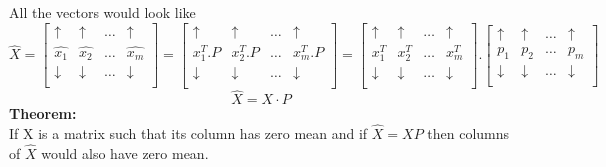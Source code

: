 \documentclass{article}
\begin{document}
All the vectors would look like\\
$$
  \hat{X}=\begin{bmatrix}
    \uparrow   & \uparrow   & \dots & \uparrow   \\
    \hat{x_1}  & \hat{x_2}  & \dots & \hat{x_m}  \\
    \downarrow & \downarrow & \dots & \downarrow \\
  \end{bmatrix}=\begin{bmatrix}
    \uparrow   & \uparrow   & \dots & \uparrow   \\
    x_1^T.P    & x_2^T.P    & \dots & x_m^T.P    \\
    \downarrow & \downarrow & \dots & \downarrow \\
  \end{bmatrix}=\begin{bmatrix}
    \uparrow   & \uparrow   & \dots & \uparrow   \\
    x_1^T      & x_2^T      & \dots & x_m^T      \\
    \downarrow & \downarrow & \dots & \downarrow \\
  \end{bmatrix}.\begin{bmatrix}
    \uparrow   & \uparrow   & \dots & \uparrow   \\
    p_1        & p_2        & \dots & p_m        \\
    \downarrow & \downarrow & \dots & \downarrow \\
  \end{bmatrix}
$$
$$
  \hat{X}=X \cdot P
$$
\textbf{Theorem:}\\
If X is a matrix such that its column has zero mean and if $\hat{X}=XP$ then columns of $\hat{X}$ would also have zero mean.\\
\end{document}
